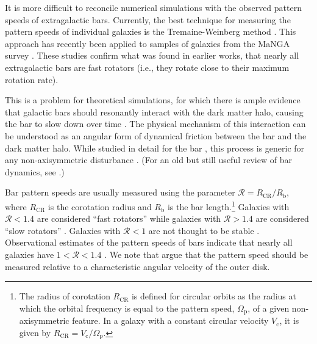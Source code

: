 \documentclass[twocolumn,linenumbers]{aastex631}
\newcommand{\RCR}{\ensuremath{R_{\textrm{CR}}}}
\newcommand{\Rot}{\ensuremath{\mathcal{R}}}
\newcommand{\Vc}{\ensuremath{V_{\textrm{c}} }}
\newcommand{\PS}{\ensuremath{\Omega_{\textrm{p}}}}
\newcommand{\Rb}{\ensuremath{R_{\textrm{b}}}}
\begin{document}
It is more difficult to reconcile numerical simulations with the observed
pattern speeds of extragalactic bars. Currently, the best technique for
measuring the pattern speeds of individual galaxies is the Tremaine-Weinberg
method \citep{1984ApJ...282L...5T, 2011MSAIS..18...23C}. This approach has
recently been applied to samples of galaxies from the MaNGA survey
\citep{2019MNRAS.482.1733G, 2020MNRAS.491.3655G}. These studies confirm
what was found in earlier works, that nearly all extragalactic bars are fast
rotators (i.e., they rotate close to their maximum rotation rate).

This is a problem for theoretical simulations, for which there is ample evidence
that galactic bars should resonantly interact with the dark matter halo, causing
the bar to slow down over time \citep{1992ApJ...400...80H, 2000ApJ...543..704D,
2002MNRAS.330...35A, 2002ApJ...569L..83A, 2003MNRAS.341.1179A,
2003MNRAS.346..251O, 2005MNRAS.363..991H, 2006ApJ...637..214M,
2007MNRAS.375..460W, 2009ApJ...697..293D}. The physical mechanism of this
interaction can be understood as an angular form of dynamical friction between
the bar and the dark matter halo. While studied in detail for the bar
\citep{1984MNRAS.209..729T, 1985MNRAS.213..451W}, this process is generic for
any non-axisymmetric disturbance \citep{1972MNRAS.157....1L}. (For an old but
still useful review of bar dynamics, see \citet{1993RPPh...56..173S}.)

Bar pattern speeds are usually measured using the parameter $\Rot=\RCR/\Rb$,
where \RCR{} is the corotation radius and \Rb{} is the bar length.\footnote{The
radius of corotation \RCR{} is defined for circular orbits as the radius at
which the orbital frequency is equal to the pattern speed, \PS{}, of a given
non-axisymmetric feature. In a galaxy with a constant circular velocity \Vc{},
it is given by $\RCR = \Vc / \PS$.} Galaxies with $\Rot < 1.4$ are considered
``fast rotators'' while galaxies with $\Rot > 1.4$ are considered ``slow
rotators'' \citep{2000ApJ...543..704D}. Galaxies with $\Rot < 1$ are not thought
to be stable \citep{1980AA....81..198C}. Observational estimates of the pattern
speeds of bars indicate that nearly all galaxies have $1 < \Rot < 1.4$
\citep{2011MSAIS..18...23C, 2015AA...576A.102A, 2019MNRAS.482.1733G,
2020MNRAS.491.3655G}. We note that \citet{2017ApJ...835..279F} argue that the
pattern speed should be measured relative to a characteristic angular velocity
of the outer disk.
\end{document}
